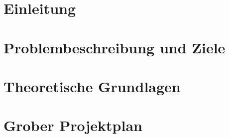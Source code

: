 \section{Einleitung}
\section{Problembeschreibung und Ziele}
\section{Theoretische Grundlagen}
\section{Grober Projektplan}